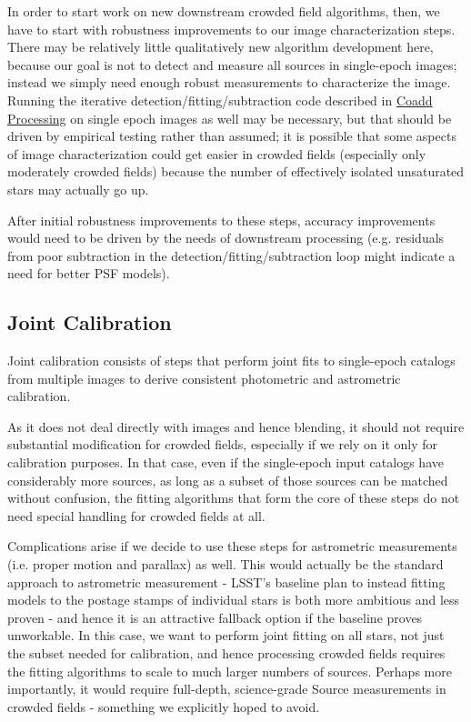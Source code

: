 \documentclass[DM,authoryear,toc]{lsstdoc}
\begin{document}
In order to start work on new downstream crowded field algorithms, then, we have to start with robustness improvements to our image characterization steps.
There may be relatively little qualitatively new algorithm development here, because our goal is not to detect and measure all sources in single-epoch images; instead we simply need enough robust measurements to characterize the image.
Running the iterative detection/fitting/subtraction code described in \hyperref[sec:coadd-processing]{Coadd Processing} on single epoch images as well may be necessary, but that should be driven by empirical testing rather than assumed; it is possible that some aspects of image characterization could get easier in crowded fields (especially only moderately crowded fields) because the number of effectively isolated unsaturated stars may actually go up.

After initial robustness improvements to these steps, accuracy improvements would need to be driven by the needs of downstream processing (e.g. residuals from poor subtraction in the detection/fitting/subtraction loop might indicate a need for better PSF models).

\subsection{Joint Calibration}
\label{sec:joint-calibration}

Joint calibration consists of steps that perform joint fits to single-epoch catalogs from multiple images to derive consistent photometric and astrometric calibration.

As it does not deal directly with images and hence blending, it should not require substantial modification for crowded fields, especially if we rely on it only for calibration purposes.
In that case, even if the single-epoch input catalogs have considerably more sources, as long as a subset of those sources can be matched without confusion, the fitting algorithms that form the core of these steps do not need special handling for crowded fields at all.

Complications arise if we decide to use these steps for astrometric measurements (i.e. proper motion and parallax) as well.
This would actually be the standard approach to astrometric measurement - LSST's baseline plan to instead fitting models to the postage stamps of individual stars is both more ambitious and less proven - and hence it is an attractive fallback option if the baseline proves unworkable.
In this case, we want to perform joint fitting on all stars, not just the subset needed for calibration, and hence processing crowded fields requires the fitting algorithms to scale to much larger numbers of sources.
Perhaps more importantly, it would require full-depth, science-grade Source measurements in crowded fields - something we explicitly hoped to avoid.
\end{document}
